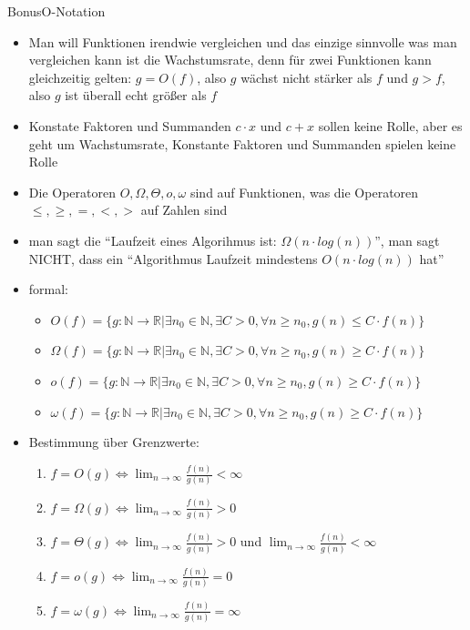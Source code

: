 \begin{frame}[allowframebreaks]{Bonus}{O-Notation}
  \begin{itemize}
    \item Man will Funktionen irendwie vergleichen und das einzige sinnvolle was man vergleichen kann ist die \alert{Wachstumsrate}, denn für zwei Funktionen kann gleichzeitig gelten: $g = O(f)$, also $g$ wächst nicht stärker als $f$ und $g > f$, also $g$ ist überall echt größer als $f$
    \item Konstate Faktoren und Summanden $c \cdot x$ und $c + x$ sollen keine Rolle, aber es geht um \alert{Wachstumsrate}, Konstante Faktoren und Summanden spielen keine Rolle
    \item Die Operatoren $O, \Omega, \Theta, o, \omega$ sind auf Funktionen, was die Operatoren $\le, \ge, =, <, >$ auf Zahlen sind
    \item man sagt die \enquote{Laufzeit eines Algorihmus ist: $\Omega(n\cdot log(n))$}, man sagt \alert{NICHT}, dass ein \enquote{Algorithmus Laufzeit mindestens $O(n\cdot log(n))$ hat}
    \item \alert{formal:} 
    \begin{itemize}
      \item $O(f)= \{g: \mathbb{N}\to\mathbb{R} | \exists n_0\in\mathbb{N}, \exists C > 0, \forall n\ge n_0, g(n)\le C \cdot f(n)\}$
      \item $\Omega(f)= \{g: \mathbb{N}\to\mathbb{R} | \exists n_0\in\mathbb{N}, \exists C > 0, \forall n\ge n_0, g(n)\ge C \cdot f(n)\}$
      \item $o(f)= \{g: \mathbb{N}\to\mathbb{R} | \exists n_0\in\mathbb{N}, \exists C > 0, \forall n\ge n_0, g(n)\ge C \cdot f(n)\}$
      \item $\omega(f)= \{g: \mathbb{N}\to\mathbb{R} | \exists n_0\in\mathbb{N}, \exists C > 0, \forall n\ge n_0, g(n)\ge C \cdot f(n)\}$
    \end{itemize}
    \item \alert{Bestimmung über Grenzwerte:}
    \begin{enumerate}
      \item $\displaystyle f=O(g) \Leftrightarrow \operatorname{lim}_{n\to\infty}\frac{f(n)}{g(n)} < \infty$
      \item $\displaystyle f=\Omega(g) \Leftrightarrow \operatorname{lim}_{n\to\infty}\frac{f(n)}{g(n)} > 0$
      \item $\displaystyle f=\Theta(g) \Leftrightarrow \operatorname{lim}_{n\to\infty}\frac{f(n)}{g(n)} > 0$ und $\displaystyle\operatorname{lim}_{n\to\infty}\frac{f(n)}{g(n)} < \infty$
      \item $\displaystyle f=o(g) \Leftrightarrow \operatorname{lim}_{n\to\infty}\frac{f(n)}{g(n)} = 0$
      \item $\displaystyle f=\omega(g) \Leftrightarrow \operatorname{lim}_{n\to\infty}\frac{f(n)}{g(n)} = \infty$
    \end{enumerate}
  \end{itemize}
\end{frame}

